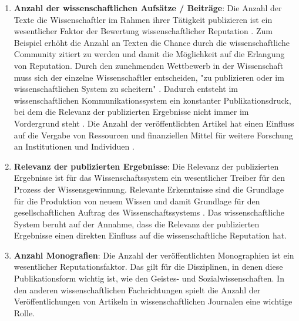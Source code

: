 \begin{enumerate}
\item \textbf{Anzahl der wissenschaftlichen Aufsätze / Beiträge}: Die Anzahl der Texte die Wissenschaftler im Rahmen ihrer Tätigkeit publizieren ist ein wesentlicher Faktor der Bewertung wissenschaftlicher Reputation \cite{Warnke_2012} \cite{CLAPHAM_2005} \cite{luhmann_1970_selbststeuerung}. Zum Beispiel erhöht die Anzahl an Texten die Chance durch die wissenschaftliche Community zitiert zu werden und damit die Möglichkeit auf die Erlangung von Reputation. Durch den zunehmenden Wettbewerb in der Wissenschaft muss sich der einzelne Wissenschaftler entscheiden, "zu publizieren oder im wissenschaftlichen System zu scheitern" \cite{Suess_2006}. Dadurch entsteht im wissenschaftlichen Kommunikationssystem ein konstanter Publikationsdruck, bei dem die Relevanz der publizierten Ergebnisse nicht immer im Vordergrund steht \cite{hamilton_1990_publishing}. Die Anzahl der veröffentlichten Artikel hat einen Einfluss auf die Vergabe von Ressourcen und finanziellen Mittel für weitere Forschung an Institutionen und Individuen \cite{Warnke_2012} \cite{hamilton_1990_publishing}.
\item \textbf{Relevanz der publizierten Ergebnisse}: Die Relevanz der publizierten Ergebnisse ist für das Wissenschaftssystem ein wesentlicher Treiber für den Prozess der Wissensgewinnung. Relevante Erkenntnisse sind die Grundlage für die Produktion von neuem Wissen und damit Grundlage für den gesellschaftlichen Auftrag des Wissenschaftssystems \cite{hanekop_2008}. Das wissenschaftliche System beruht auf der Annahme, dass die Relevanz der publizierten Ergebnisse einen direkten Einfluss auf die wissenschaftliche Reputation hat.
\item \textbf{Anzahl Monografien}: Die Anzahl der veröffentlichten Monographien ist ein wesentlicher Reputationsfaktor. Das gilt für die Disziplinen, in denen diese Publikationsform wichtig ist, wie den Geistes- und Sozialwissenschaften. In den anderen wissenschaftlichen Fachrichtungen spielt die Anzahl der Veröffentlichungen von Artikeln in wissenschaftlichen Journalen eine wichtige Rolle.

\end{enumerate}
